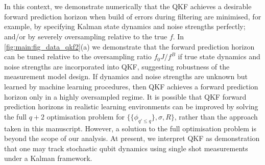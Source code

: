 \\
\\
In this context, we demonstrate numerically that the QKF achieves a desirable forward prediction horizon when build of errors during filtering are minimised, for example, by specifying Kalman state dynamics and noise strengths perfectly; and/or by severely oversampling relative to the true $f$.   In \cref{fig:main:fig_data_qkf2}(a) we demonstrate that the forward prediction horizon can be tuned relative to the oversampling ratio $f_0J / f^B$ if true state dynamics and noise strengths are incorporated into QKF, suggesting robustness of the measurement model design.  If dynamics and noise strengths are unknown but learned by machine learning procedures, then QKF achieves a forward prediction horizon only in a highly oversampled regime. It is possible that QKF forward prediction horizons in realistic learning environments can be improved by solving the full $q+2$ optimisation problem for $\{\{ \phi_{q' \leq q}\}, \sigma, R\}$, rather than the approach taken in this manuscript. However, a solution to the full optimisation problem is beyond the scope of our analysis. At present, we interpret QKF as demonstration that one may track stochastic qubit dynamics using single shot measurements under a Kalman framework.

